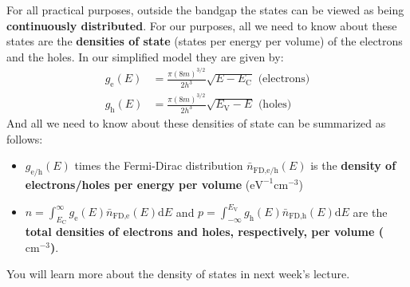 \documentclass[11pt]{article}
\begin{document}
For all practical purposes, outside the bandgap the states can be viewed as being {\bf continuously distributed}. For our purposes, all we need to know about these states are the \textbf{densities of state} (states per energy per volume) of the electrons and the holes. In our simplified model they are given by:
\begin{align}
	g_\text{e}(E)&=\frac{\pi(8m)^{3/2}}{2h^3}\sqrt{E-E_\text{C}} \text{ (electrons)}\\
	g_\text{h}(E)&=\frac{\pi(8m)^{3/2}}{2h^3}\sqrt{E_\text{V}-E} \text{ (holes)}
\end{align}
And all we need to know about these densities of state can be summarized as follows:
\begin{itemize}\itemsep0pt
\item $g_\mathrm{e/h}(E)$ times the Fermi-Dirac distribution $\bar {n}_\text{FD,e/h}(E)$ is the {\bf density of electrons/holes per energy per volume} ($\mathrm{eV^{-1}cm^{-3}}$)
\item $n=\int_{E_\text{C}}^\infty g_\text{e}(E) \bar {n}_\text{FD,e}(E) \text{d}E$ and $p=\int_{-\infty}^{E_\text{V}} g_\text{h}(E) \bar {n}_\text{FD,h}(E) \text{d}E$ are the {\bf total densities of electrons and holes, respectively, per volume ($\mathrm{cm^{-3}}$)}.
\end{itemize}
You will learn more about the density of states in next week's lecture.
\end{document}
